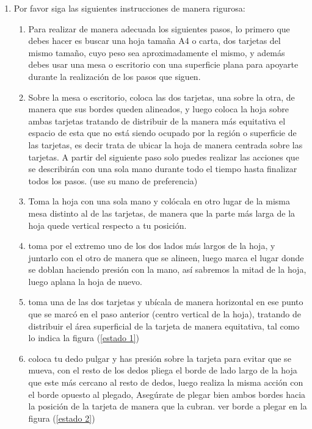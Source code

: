 \documentclass{article}
\begin{document}
\begin{enumerate}
  \item Por favor siga las siguientes instrucciones de manera rigurosa:
  \begin{enumerate}
  
  \item Para realizar de manera adecuada los siguientes pasos, lo primero que debes hacer es buscar una hoja tamaña A4 o carta, dos tarjetas del mismo tamaño, cuyo peso sea aproximadamente el mismo, y además debes usar una mesa o escritorio con una superficie plana para apoyarte durante la realización de los pasos que siguen.
  
  \item Sobre la mesa o escritorio, coloca las dos tarjetas, una sobre la otra, de manera que sus bordes queden alineados, y luego coloca la hoja sobre ambas tarjetas tratando de distribuir de la manera más equitativa el espacio de esta que no está siendo ocupado por la región o superficie de las tarjetas, es decir trata de ubicar la hoja de manera centrada sobre las tarjetas. A partir del siguiente paso solo puedes realizar las acciones que se describirán con una sola mano durante todo el tiempo hasta finalizar todos los pasos. (use su mano de preferencia)
  
  \item Toma la hoja con una sola mano y colócala en otro lugar de la misma mesa distinto al de las tarjetas, de manera que la parte más larga de la hoja quede vertical respecto a tu posición.
  
  \item toma por el extremo uno de los dos lados más largos de la hoja, y juntarlo con el otro de manera que se alineen, luego marca el lugar donde se doblan haciendo presión con la mano, así sabremos la mitad de la hoja, luego aplana la hoja de nuevo.
  
  \item toma una de las dos tarjetas y ubícala de manera horizontal en ese punto que se marcó en el paso anterior (centro vertical de la hoja), tratando de distribuir el área superficial de la tarjeta de manera equitativa, tal como lo indica la figura (\ref{estado 1})
  
  \item coloca tu dedo pulgar y has presión sobre la tarjeta para evitar que se mueva, con el resto de los dedos pliega el borde de lado largo de la hoja que este más cercano al resto de dedos, luego realiza la misma acción con el borde opuesto al plegado, Asegúrate de plegar bien ambos bordes hacia la posición de la tarjeta de manera que la cubran. ver borde a plegar en la figura (\ref{estado 2})
  

\end{enumerate}
\end{enumerate}
\end{document}
